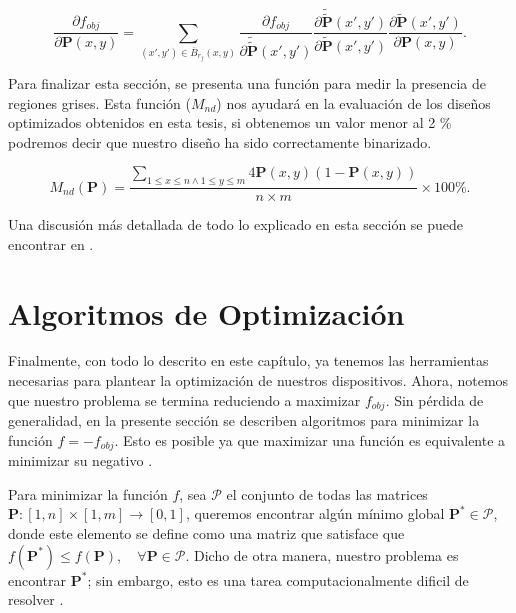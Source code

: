\begin{equation}
  \frac{\partial f_{obj}}{\partial \boldsymbol{P}(x, y)} = \displaystyle\sum_{(x', y') \in \overline{B}_{r_f}(x, y)}
  \frac{\partial f_{obj}}{\partial \widetilde{\widetilde{\boldsymbol{P}}}(x', y')}
  \frac{\partial \widetilde{\widetilde{\boldsymbol{P}}}(x', y')}{\partial \widetilde{\boldsymbol{P}}(x', y')}
   \frac{\partial \widetilde{\boldsymbol{P}}(x', y')}{\partial \boldsymbol{P}(x, y)}.
  \label{eq:fobjgrad}
\end{equation}

Para finalizar esta sección, se presenta una función para medir la presencia de regiones grises.
Esta función ($M_{nd}$) nos ayudará en la evaluación de los diseños optimizados obtenidos en esta tesis,
si obtenemos un valor menor al 2 \% podremos decir que nuestro diseño ha sido correctamente binarizado.

\begin{equation}
  M_{nd} (\boldsymbol{P}) = \frac{\sum_{1 \leq x \leq n \land 1 \leq y \leq m}
  4 \boldsymbol{P}(x, y)(1 - \boldsymbol{P}(x, y))}{n \times m} \times 100 \%.
\label{eq:grayscale}
\end{equation}

Una discusión más detallada de todo lo explicado en esta sección se puede encontrar en \cite{Lazarov2016}.

\section{Algoritmos de Optimización}\label{sec:alg-opt}

Finalmente, con todo lo descrito en este capítulo, ya tenemos las herramientas necesarias
para plantear la optimización de nuestros dispositivos.
Ahora, notemos que nuestro problema se termina reduciendo a maximizar $f_{obj}$.
Sin pérdida de generalidad, en la presente sección se describen algoritmos
para minimizar la función $f = -f_{obj}$.
Esto es posible ya que maximizar una función es equivalente a minimizar su negativo \citep{Mykel2019}.


Para minimizar la función $f$, sea $\pmb{\mathscr{P}}$ el conjunto de todas las matrices 
$\boldsymbol{P}: [1, n] \times [1, m] \to [0, 1]$, queremos encontrar algún mínimo global 
$\boldsymbol{P^{*}} \in \pmb{\mathscr{P}}$, 
donde este elemento se define como una matriz que satisface que
$f(\boldsymbol{P^{*}}) \leq f(\boldsymbol{P}), \quad \forall \boldsymbol{P} \in \pmb{\mathscr{P}}$. 
Dicho de otra manera, nuestro problema es encontrar $\boldsymbol{P^{*}}$; sin embargo,
esto es una tarea computacionalmente dificil de resolver \citep{Angeris2021}.

